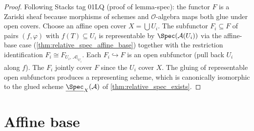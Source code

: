 \begin{proof}
  
  \leanok
  Following Stacks tag 01LQ (proof of lemma-spec): the functor \(F\) is a Zariski sheaf
  because morphisms of schemes and \(\mathcal{O}\)-algebra maps both glue under open covers.
  Choose an affine open cover \(X = \bigcup U_i\). The subfunctor
  \(F_i \subseteq F\) of pairs \((f, \varphi)\) with \(f(T) \subseteq U_i\) is representable by
  \(\Spec(\mathcal{A}(U_i))\) via the affine-base case
  (\cref{thm:relative_spec_affine_base}) together with the
  restriction identification \(F_i \cong F_{U_i,\,\mathcal{A}|_{U_i}}\).
  Each \(F_i \hookrightarrow F\) is an open
  subfunctor (pull back \(U_i\) along \(f\)). The \(F_i\) jointly cover \(F\) since the \(U_i\)
  cover \(X\). The gluing of representable open subfunctors produces a representing scheme,
  which is canonically isomorphic to the glued scheme \(\underline{\Spec}_X(\mathcal{A})\)
  of \cref{thm:relative_spec_exists}.
\end{proof}

\section{Affine base}
\label{sec:relspec_affine}

